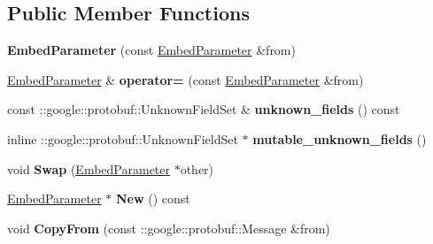 \subsection*{Public Member Functions}
\begin{DoxyCompactItemize}
\item 
\mbox{\label{classcaffe_1_1_embed_parameter_ace9270c8d531a5e1ee56f86e158e2a45}} 
{\bfseries Embed\+Parameter} (const \mbox{\hyperlink{classcaffe_1_1_embed_parameter}{Embed\+Parameter}} \&from)
\item 
\mbox{\label{classcaffe_1_1_embed_parameter_ae298fa86c4904200ff2f000cd42e892d}} 
\mbox{\hyperlink{classcaffe_1_1_embed_parameter}{Embed\+Parameter}} \& {\bfseries operator=} (const \mbox{\hyperlink{classcaffe_1_1_embed_parameter}{Embed\+Parameter}} \&from)
\item 
\mbox{\label{classcaffe_1_1_embed_parameter_a629032564615bdae407c0a4bd47406db}} 
const \+::google\+::protobuf\+::\+Unknown\+Field\+Set \& {\bfseries unknown\+\_\+fields} () const
\item 
\mbox{\label{classcaffe_1_1_embed_parameter_a9f581a0a11301a46b388ede9697a1099}} 
inline \+::google\+::protobuf\+::\+Unknown\+Field\+Set $\ast$ {\bfseries mutable\+\_\+unknown\+\_\+fields} ()
\item 
\mbox{\label{classcaffe_1_1_embed_parameter_a17b6b7b2f1e36fa5bcb3eea0afabcb64}} 
void {\bfseries Swap} (\mbox{\hyperlink{classcaffe_1_1_embed_parameter}{Embed\+Parameter}} $\ast$other)
\item 
\mbox{\label{classcaffe_1_1_embed_parameter_ad6bb95dad55f21cb35a9c3bda3403c8e}} 
\mbox{\hyperlink{classcaffe_1_1_embed_parameter}{Embed\+Parameter}} $\ast$ {\bfseries New} () const
\item 
\mbox{\label{classcaffe_1_1_embed_parameter_ac5d59d0029474a9a41ed8ff805419e65}} 
void {\bfseries Copy\+From} (const \+::google\+::protobuf\+::\+Message \&from)
\item 
\mbox{\label{classcaffe_1_1_embed_parameter_afe6e8d2cbbb67c3a08ced52baf0825be}} 

\end{DoxyCompactItemize}
